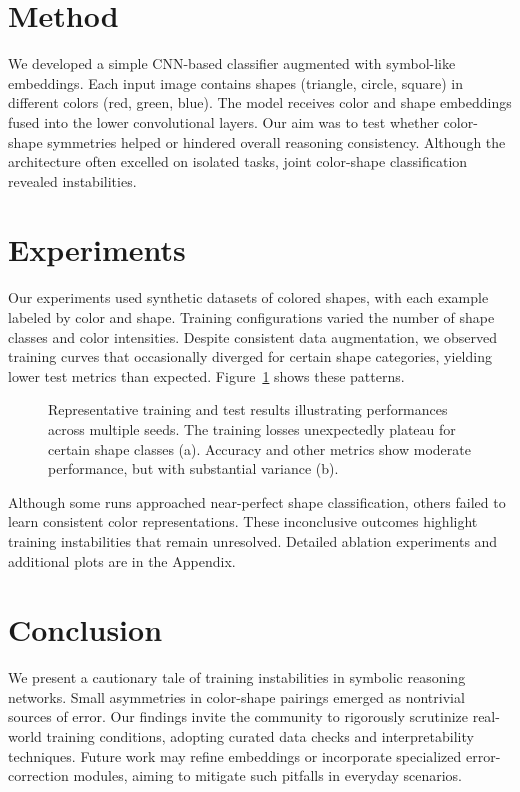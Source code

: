 \documentclass[11pt]{article}
\begin{document}
\section{Method}
We developed a simple CNN-based classifier augmented with symbol-like embeddings. Each input image contains shapes (triangle, circle, square) in different colors (red, green, blue). The model receives color and shape embeddings fused into the lower convolutional layers. Our aim was to test whether color-shape symmetries helped or hindered overall reasoning consistency. Although the architecture often excelled on isolated tasks, joint color-shape classification revealed instabilities.

\section{Experiments}
Our experiments used synthetic datasets of colored shapes, with each example labeled by color and shape. Training configurations varied the number of shape classes and color intensities. Despite consistent data augmentation, we observed training curves that occasionally diverged for certain shape categories, yielding lower test metrics than expected. Figure~\ref{fig:baseline} shows these patterns.

\begin{figure}[t]
    \centering
    \hspace{0.08\textwidth}
    \caption{Representative training and test results illustrating performances across multiple seeds. The training losses unexpectedly plateau for certain shape classes (a). Accuracy and other metrics show moderate performance, but with substantial variance (b).}
    \label{fig:baseline}
\end{figure}

Although some runs approached near-perfect shape classification, others failed to learn consistent color representations. These inconclusive outcomes highlight training instabilities that remain unresolved. Detailed ablation experiments and additional plots are in the Appendix.

\section{Conclusion}
We present a cautionary tale of training instabilities in symbolic reasoning networks. Small asymmetries in color-shape pairings emerged as nontrivial sources of error. Our findings invite the community to rigorously scrutinize real-world training conditions, adopting curated data checks and interpretability techniques. Future work may refine embeddings or incorporate specialized error-correction modules, aiming to mitigate such pitfalls in everyday scenarios.
\end{document}
